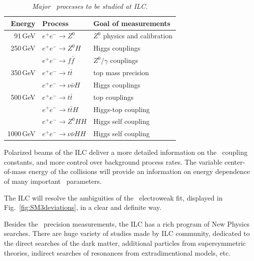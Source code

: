\begin{table}[H]
\centering

\begin{tabular}{@{}rll@{}}
\toprule
Energy & Process & Goal of measurements\\ 
\midrule

91\,GeV  & $e^+e^- \to Z^0$  		& $Z^0$ physics and calibration \\
250\,GeV & $e^+e^- \to Z^0H$  		& Higgs couplings \\
		 & $e^+e^- \to f\bar{f}$  	& $Z^0/\gamma$ couplings \\
350\,GeV & $e^+e^- \to t\bar{t}$ 	& top mass precision \\
		 & $e^+e^- \to \nu\bar{\nu}H$ & Higgs couplings \\
500\,GeV & $e^+e^- \to t\bar{t}$ 	& top couplings \\
 		 & $e^+e^- \to t\bar{t}H$ 	& Higgs-top coupling \\ 
 		 & $e^+e^- \to Z^0HH$ 		& Higgs self coupling \\ 
1000\,GeV & $e^+e^- \to \nu\bar{\nu}HH$&  Higgs self coupling \\
 \bottomrule
\end{tabular}

\caption{\sl Major \sm\ processes to be studied at ILC. \cite{bib:ILC}}
\label{table:SMILCmeasurements}
\end{table}
Polarized beams of the ILC deliver a more detailed information on the \sm\ coupling constants, and more control over background process rates. 
The variable center-of-mass energy of the collisions will provide an information on energy dependence of many important \sm\ parameters. 
 
The ILC will resolve the ambiguities of the \sm\ electroweak fit, displayed in Fig.~\ref{fig:SM3deviations}, in a clear and definite way. 


Besides the \sm\ precision measurements, the ILC has a rich program of New Physics searches. 
There are huge variety of studies made by ILC community, dedicated to the direct searches of the dark matter, additional particles from supersymmetric theories, indirect searches of resonances from extradimentional models, etc.

